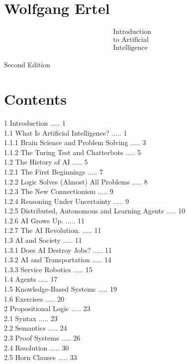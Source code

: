 \documentclass[10pt]{article}
\begin{document}
\section*{Wolfgang Ertel}
$$
\begin{aligned}
& \text { Introduction } \\
& \text { to Artificial } \\
& \text { Intelligence }
\end{aligned}
$$

Second Edition

\section*{Contents}
1 Introduction ..... 1\\
1.1 What Is Artificial Intelligence? ..... 1\\
1.1.1 Brain Science and Problem Solving ..... 3\\
1.1.2 The Turing Test and Chatterbots ..... 5\\
1.2 The History of AI ..... 5\\
1.2.1 The First Beginnings ..... 7\\
1.2.2 Logic Solves (Almost) All Problems ..... 8\\
1.2.3 The New Connectionism ..... 9\\
1.2.4 Reasoning Under Uncertainty ..... 9\\
1.2.5 Distributed, Autonomous and Learning Agents ..... 10\\
1.2.6 AI Grows Up. ..... 11\\
1.2.7 The AI Revolution. ..... 11\\
1.3 AI and Society ..... 11\\
1.3.1 Does AI Destroy Jobs? ..... 11\\
1.3.2 AI and Transportation ..... 14\\
1.3.3 Service Robotics ..... 15\\
1.4 Agents ..... 17\\
1.5 Knowledge-Based Systems ..... 19\\
1.6 Exercises ..... 20\\
2 Propositional Logic ..... 23\\
2.1 Syntax ..... 23\\
2.2 Semantics ..... 24\\
2.3 Proof Systems ..... 26\\
2.4 Resolution ..... 30\\
2.5 Horn Clauses ..... 33\\
\end{document}
